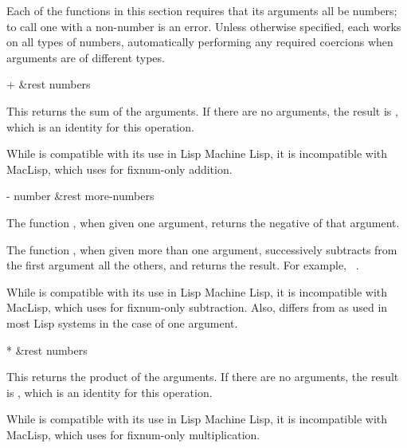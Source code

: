 Each of the functions in this section requires that its arguments all be
numbers; to call one with a non-number is an error.  Unless otherwise
specified, each works on all types of numbers, automatically performing
any required coercions when arguments are of different types.

\begin{defun}[Function]
+ &rest numbers

This returns the sum of the arguments.  If there are no arguments, the result
is , which is an identity for this operation.

\beforenoterule
\begin{incompatibility}
While \cd{+} is compatible with its use in Lisp Machine Lisp,
it is incompatible with MacLisp, which uses \cd{+} for fixnum-only
addition.
\end{incompatibility}
\afternoterule
\end{defun}

\begin{defun}[Function]
- number &rest more-numbers

The function \cd{-}, when given one argument, returns the negative
of that argument.

The function \cd{-}, when given more than one argument, successively subtracts
from the first argument all the others, and returns the result.
For example,  \EV\ .

\beforenoterule
\begin{incompatibility}
While \cd{-} is compatible with its use in Lisp Machine Lisp,
it is incompatible with MacLisp, which uses \cd{-} for fixnum-only
subtraction.
Also, \cd{-} differs from  as used in most Lisp
systems in the case of one argument.
\end{incompatibility}
\afternoterule
\end{defun}

\begin{defun}[Function]
* &rest numbers

This returns the product of the arguments.
If there are no arguments, the result
is , which is an identity for this operation.

\beforenoterule
\begin{incompatibility}
While \cd{*} is compatible with its use in Lisp Machine Lisp,
it is incompatible with MacLisp, which uses \cd{*} for fixnum-only
multiplication.
\end{incompatibility}
\afternoterule
\end{defun}

